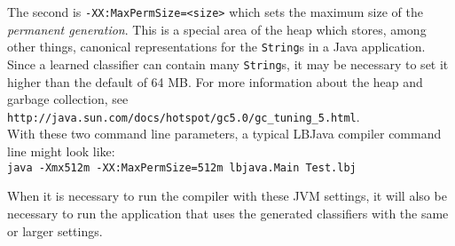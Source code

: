 The second is {\tt -XX:MaxPermSize=<size>} which sets the maximum size of the
\emph{permanent generation}.  This is a special area of the heap which stores,
among other things, canonical representations for the {\tt String}s in a Java
application.  Since a learned classifier can contain many {\tt String}s, it
may be necessary to set it higher than the default of 64 MB.  For more
information about the heap and garbage collection, see {\tt
http://java.sun.com/docs/hotspot/gc5.0/gc\_tuning\_5.html}. \\

With these two command line parameters, a typical LBJava compiler command line
might look like: \\

\vspace{-.25cm}
{\tt java -Xmx512m -XX:MaxPermSize=512m lbjava.Main Test.lbj} \\
\vspace{-.25cm}

\noindent
When it is necessary to run the compiler with these JVM settings, it will also
be necessary to run the application that uses the generated classifiers with
the same or larger settings.

